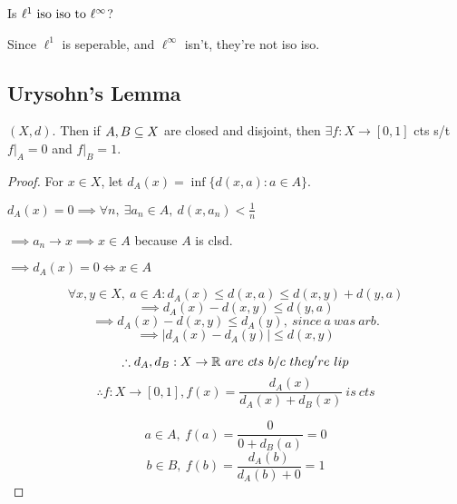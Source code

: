 \documentclass[12pt]{article}
\begin{document}
\bboxexam
\begin{exam}
    Is \(\ell^1\text{ iso iso to }\ell^\infty\)?

    Since \(\ell^1\) is seperable, and \(\ell^\infty\) isn't,
    they're not iso iso.
\end{exam}
\ebox

\subsection{Urysohn's Lemma}

\bboxthm
\begin{thm}
    \((X,d)\). Then if \(A,B\subseteq X\) are closed and disjoint, then
    \(\exists f:X\to[0,1]\) cts s/t \(f|_A=0\) and \(f|_B=1\).
\end{thm}
\ebox

\bboxproof
\begin{proof}
    For \(x\in X\), let \(d_A(x)=\inf\{d(x,a):a\in A\}\).
    \bboxnote
    \begin{note}
        \(d_A(x)=0\implies\forall n,\ \exists a_n\in A,\ 
        d(x,a_n)<\frac1n\)

        \(\implies a_n\to x\implies x\in A\) because \(A\) is clsd.

        \(\implies d_A(x)=0\iff x\in A\)
    \end{note}
    \ebox
    \[
        \forall x,y\in X,\ a\in A:
        d_A(x)\le d(x,a)\le d(x,y)+d(y,a)
    \]
    \[
        \implies d_A(x)-d(x,y)\le d(y,a)
    \]
    \[
        \implies d_A(x)-d(x,y)\le d_A(y),\ since\ a\ was\ arb.
    \]
    \[
        \implies|d_A(x)-d_A(y)|\le d(x,y)
    \]

    \[
        \therefore d_A,d_B:X\to\R\ are\ cts\ b/c\ they're\ lip
    \]
    \[
        \therefore f:X\to[0,1], f(x)=\frac{d_A(x)}{d_A(x)+d_B(x)}\ is\ cts
    \]

    \[
        a\in A,\ f(a)=\frac0{0+d_B(a)}=0
    \]
    \[
        b\in B,\ f(b)=\frac{d_A(b)}{d_A(b)+0}=1
    \]
\end{proof}
\ebox


\end{document}
